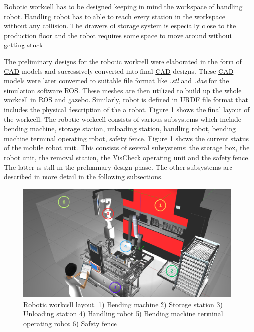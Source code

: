 
Robotic workcell has to be designed keeping in mind the workspace of handling robot. Handling robot has to able to reach every station in the workspace without any collision. The drawers of storage system is especially close
to the production floor and the robot requires some space to move around without getting stuck. 

The preliminary designs for the robotic workcell were elaborated
in the form of \hyperref[acro:CAD]{CAD} models and successively converted into final \hyperref[acro:CAD]{CAD} designs. 
These \hyperref[acro:CAD]{CAD} models were later converted to suitable file format like \textit{.stl} and \textit{.dae} for the simulation software \hyperref[acro:ROS]{ROS}.
These meshes are then utilized to build up the whole workcell in \hyperref[acro:ROS]{ROS} and gazebo. Similarly, robot is defined in \hyperref[acro:URDF]{URDF} file format that includes
the physical description of the a robot.
Figure \ref{fig:robotic-workcell} shows the final layout of the workcell. The robotic workcell consists of various subsystems which include bending machine, storage station, unloading station, handling robot, bending machine terminal operating robot, safety fence.
Figure 1 shows the
current status of the mobile robot unit. This consists of several subsystems: the storage box, the robot
unit, the removal station, the VisCheck operating unit and the safety fence. The latter is still in the
preliminary design phase. The other subsystems are described in more detail in the following
subsections.

\begin{figure}[h]
    \centering
    \includegraphics[width=\textwidth]{figures/robotic-workcell1.png}
    \caption{Robotic workcell layout. 1) Bending machine 2) Storage station 3) Unloading station 4) Handling robot 5) Bending machine terminal operating robot 6) Safety fence}
    \label{fig:robotic-workcell}

\end{figure}

